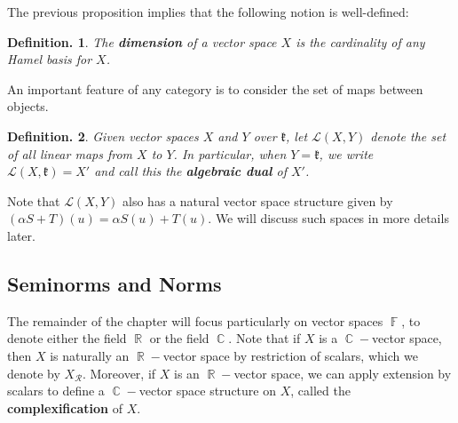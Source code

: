 \documentclass[11pt, a4paper]{memoir}
\DeclareMathOperator{\R}{{\mathbb{R}}}
\DeclareMathOperator{\C}{{\mathbb{C}}}
\DeclareMathOperator{\F}{{\mathbb{F}}}
\theoremstyle{change}
\theoremstyle{plain}
\theoremstyle{nonumberplain}
\newtheorem{definition}{Definition.}
\numberwithin{equation}{section}
\begin{document}
The previous proposition implies that the following notion is well-defined:
\begin{definition}
    The \textbf{dimension} of a vector space $X$ is the cardinality of any Hamel basis for $X$.
\end{definition}
An important feature of any category is to consider the set of maps between objects.
\begin{definition}
    Given vector spaces $X$ and $Y$ over $\mathfrak{k}$, let $\mathcal{L}(X,Y)$ denote the set of all linear maps from $X$ to $Y$.
    In particular, when $Y=\mathfrak{k}$, we write $\mathcal{L}(X,\mathfrak{k})=X'$ and call this the \textbf{algebraic dual} of $X'$.
\end{definition}
Note that $\mathcal{L}(X,Y)$ also has a natural vector space structure given by $(\alpha S+T)(u)=\alpha S(u)+T(u)$.
We will discuss such spaces in more details later.

\subsection{Seminorms and Norms}
The remainder of the chapter will focus particularly on vector spaces $\F$, to denote either the field $\R$ or the field $\C$.
Note that if $X$ is a $\C-$vector space, then $X$ is naturally an $\R-$vector space by restriction of scalars, which we denote by $X_{\mathcal{R}}$.
Moreover, if $X$ is an $\R-$vector space, we can apply extension by scalars to define a $\C-$vector space structure on $X$, called the \textbf{complexification} of $X$.
\end{document}
